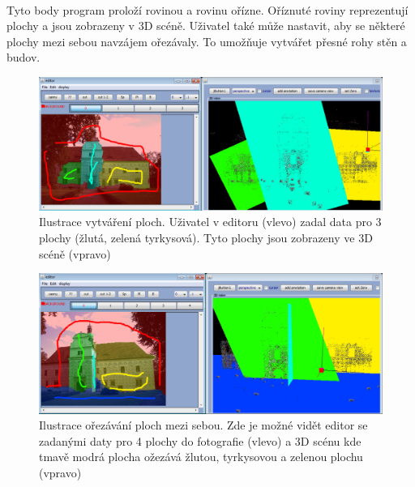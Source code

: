 \documentclass[11pt,twoside,a4paper]{book}
\begin{document}
\paragraph{}
Tyto body program proloží rovinou a rovinu ořízne. Oříznuté roviny reprezentují plochy a jsou zobrazeny v 3D scéně. Uživatel také může nastavit, aby se některé plochy mezi sebou navzájem ořezávaly. To umožňuje vytvářet přesné rohy stěn a budov.

\begin{figure}[h]
	\begin{center}
		\includegraphics[width=15cm]{ilustrace/program/P-1}
		\caption{Ilustrace vytváření ploch. Uživatel v editoru (vlevo) zadal data pro 3 plochy (žlutá, zelená tyrkysová). Tyto plochy jsou zobrazeny ve 3D scéně (vpravo) }
		\label{fig:P-1}
	\end{center}
\end{figure}

\begin{figure}[]
	\begin{center}
		\includegraphics[width=15cm]{ilustrace/program/P-2}
		\caption{Ilustrace ořezávání ploch mezi sebou. Zde je možné vidět editor se zadanými daty pro 4 plochy do fotografie (vlevo) a 3D scénu kde tmavě modrá plocha ožezává žlutou, tyrkysovou a zelenou plochu (vpravo) }
		\label{fig:P-2}
	\end{center}
\end{figure}
\end{document}
